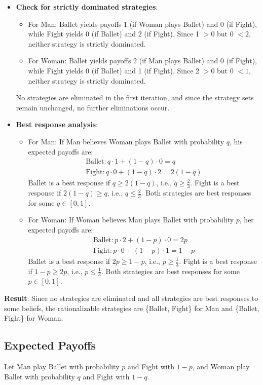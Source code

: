 \documentclass[a4paper,12pt]{article}
\begin{document}
\begin{itemize}
\item \textbf{Check for strictly dominated strategies}:
\begin{itemize}
\item For Man: Ballet yields payoffs 1 (if Woman plays Ballet) and 0 (if Fight), while Fight yields 0 (if Ballet) and 2 (if Fight). Since 1 $> 0$ but 0 $< 2$, neither strategy is strictly dominated.
\item For Woman: Ballet yields payoffs 2 (if Man plays Ballet) and 0 (if Fight), while Fight yields 0 (if Ballet) and 1 (if Fight). Since 2 $> 0$ but 0 $< 1$, neither strategy is strictly dominated.
\end{itemize}
No strategies are eliminated in the first iteration, and since the strategy sets remain unchanged, no further eliminations occur.
\item \textbf{Best response analysis}:
\begin{itemize}
\item For Man: If Man believes Woman plays Ballet with probability $q$, his expected payoffs are:
\begin{align*}
\text{Ballet}: q \cdot 1 + (1-q) \cdot 0 = q \\
\text{Fight}: q \cdot 0 + (1-q) \cdot 2 = 2(1-q)
\end{align*}
Ballet is a best response if $q \geq 2(1-q)$, i.e., $q \geq \frac{2}{3}$. Fight is a best response if $2(1-q) \geq q$, i.e., $q \leq \frac{2}{3}$. Both strategies are best responses for some $q \in [0,1]$.
\item For Woman: If Woman believes Man plays Ballet with probability $p$, her expected payoffs are:
\begin{align*}
\text{Ballet}: p \cdot 2 + (1-p) \cdot 0 = 2p \\
\text{Fight}: p \cdot 0 + (1-p) \cdot 1 = 1-p
\end{align*}
Ballet is a best response if $2p \geq 1-p$, i.e., $p \geq \frac{1}{3}$. Fight is a best response if $1-p \geq 2p$, i.e., $p \leq \frac{1}{3}$. Both strategies are best responses for some $p \in [0,1]$.
\end{itemize}
\end{itemize}

\textbf{Result}: Since no strategies are eliminated and all strategies are best responses to some beliefs, the rationalizable strategies are \{Ballet, Fight\} for Man and \{Ballet, Fight\} for Woman.

\subsection{Expected Payoffs}
Let Man play Ballet with probability $p$ and Fight with $1-p$, and Woman play Ballet with probability $q$ and Fight with $1-q$.
\end{document}
